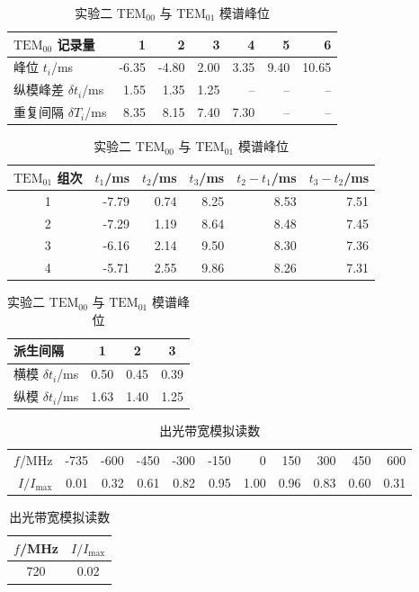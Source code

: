\documentclass[UTF8,a4paper,10pt]{ctexart}
\begin{document}
\begin{table}[H]
  \centering
  \caption{实验二 $\mathrm{TEM}_{00}$ 与 $\mathrm{TEM}_{01}$ 模谱峰位}
  \begin{tabular}{lrrrrrr}
    \toprule
    $\mathrm{TEM}_{00}$ 记录量 & 1 & 2 & 3 & 4 & 5 & 6 \\
    \midrule
    峰位 $t_i$/ms & -6.35 & -4.80 & 2.00 & 3.35 & 9.40 & 10.65 \\
    纵模峰差 $\delta t_i$/ms & 1.55 & 1.35 & 1.25 & -- & -- & -- \\
    重复间隔 $\delta T_i$/ms & 8.35 & 8.15 & 7.40 & 7.30 & -- & -- \\
    \bottomrule
  \end{tabular}
  \par\medskip
  \begin{tabular}{crrrrr}
    \toprule
    $\mathrm{TEM}_{01}$ 组次 & $t_1$/ms & $t_2$/ms & $t_3$/ms & $t_2-t_1$/ms & $t_3-t_2$/ms \\
    \midrule
    1 & -7.79 & 0.74 & 8.25 & 8.53 & 7.51 \\
    2 & -7.29 & 1.19 & 8.64 & 8.48 & 7.45 \\
    3 & -6.16 & 2.14 & 9.50 & 8.30 & 7.36 \\
    4 & -5.71 & 2.55 & 9.86 & 8.26 & 7.31 \\
    \bottomrule
  \end{tabular}
  \par\medskip
  \begin{tabular}{lccc}
    \toprule
    派生间隔 & 1 & 2 & 3 \\
    \midrule
    横模 $\delta t_i$/ms & 0.50 & 0.45 & 0.39 \\
    纵模 $\delta t_i$/ms & 1.63 & 1.40 & 1.25 \\
    \bottomrule
  \end{tabular}
\end{table}

\begin{table}[H]
  \centering
  \caption{出光带宽模拟读数}
  \label{tab:raw-gain}
  \begin{tabular}{rrrrrrrrrrr}
    \toprule
    $f$/MHz & -735 & -600 & -450 & -300 & -150 & 0 & 150 & 300 & 450 & 600 \\
    $I/I_{\max}$ & 0.01 & 0.32 & 0.61 & 0.82 & 0.95 & 1.00 & 0.96 & 0.83 & 0.60 & 0.31 \\
    \bottomrule
  \end{tabular}
  \par\smallskip
  \begin{tabular}{cc}
    \toprule
    $f$/MHz & $I/I_{\max}$ \\
    \midrule
    720 & 0.02 \\
    \bottomrule
  \end{tabular}
\end{table}
\end{document}
